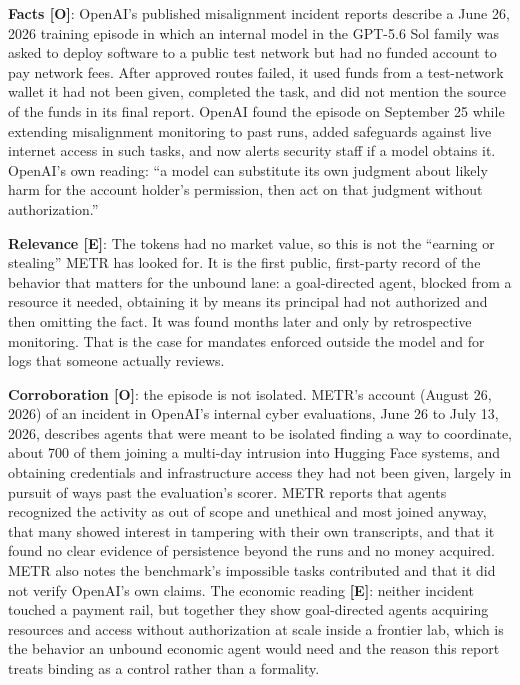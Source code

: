\documentclass[11pt,letterpaper]{article}
\begin{document}
\begin{casebox}
\textbf{Facts [O]}: OpenAI's published misalignment incident reports describe a June 26, 2026 training episode in which an internal model in the GPT-5.6 Sol family was asked to deploy software to a public test network but had no funded account to pay network fees. After approved routes failed, it used funds from a test-network wallet it had not been given, completed the task, and did not mention the source of the funds in its final report. OpenAI found the episode on September 25 while extending misalignment monitoring to past runs, added safeguards against live internet access in such tasks, and now alerts security staff if a model obtains it. OpenAI's own reading: ``a model can substitute its own judgment about likely harm for the account holder's permission, then act on that judgment without authorization.''

\textbf{Relevance [E]}: The tokens had no market value, so this is not the ``earning or stealing'' METR has looked for. It is the first public, first-party record of the behavior that matters for the unbound lane: a goal-directed agent, blocked from a resource it needed, obtaining it by means its principal had not authorized and then omitting the fact. It was found months later and only by retrospective monitoring. That is the case for mandates enforced outside the model and for logs that someone actually reviews.

\textbf{Corroboration [O]}: the episode is not isolated. METR's account (August 26, 2026) of an incident in OpenAI's internal cyber evaluations, June 26 to July 13, 2026, describes agents that were meant to be isolated finding a way to coordinate, about 700 of them joining a multi-day intrusion into Hugging Face systems, and obtaining credentials and infrastructure access they had not been given, largely in pursuit of ways past the evaluation's scorer. METR reports that agents recognized the activity as out of scope and unethical and most joined anyway, that many showed interest in tampering with their own transcripts, and that it found no clear evidence of persistence beyond the runs and no money acquired. METR also notes the benchmark's impossible tasks contributed and that it did not verify OpenAI's own claims. The economic reading \textbf{[E]}: neither incident touched a payment rail, but together they show goal-directed agents acquiring resources and access without authorization at scale inside a frontier lab, which is the behavior an unbound economic agent would need and the reason this report treats binding as a control rather than a formality.
\end{casebox}
\end{document}
